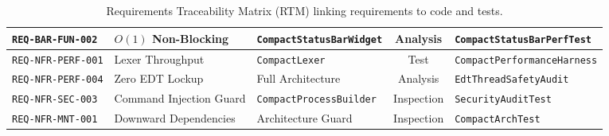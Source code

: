 \begin{table}[htbp]
\begin{tabularx}{\textwidth}{l p{3.2cm} p{3.8cm} c p{3.2cm}}
        \texttt{REQ-BAR-FUN-002} & $O(1)$ Non-Blocking & \texttt{CompactStatusBarWidget} & Analysis & \texttt{CompactStatusBarPerfTest} \\
        \midrule
        \texttt{REQ-NFR-PERF-001} & Lexer Throughput & \texttt{CompactLexer} & Test & \texttt{CompactPerformanceHarness} \\
        \texttt{REQ-NFR-PERF-004} & Zero EDT Lockup & Full Architecture & Analysis & \texttt{EdtThreadSafetyAudit} \\
        \texttt{REQ-NFR-SEC-003} & Command Injection Guard & \texttt{CompactProcessBuilder} & Inspection & \texttt{SecurityAuditTest} \\
        \texttt{REQ-NFR-MNT-001} & Downward Dependencies & Architecture Guard & Inspection & \texttt{CompactArchTest} \\
        \bottomrule
    \end{tabularx}
    \caption{Requirements Traceability Matrix (RTM) linking requirements to code and tests.}
    \label{tab:rtm}
\end{table}

